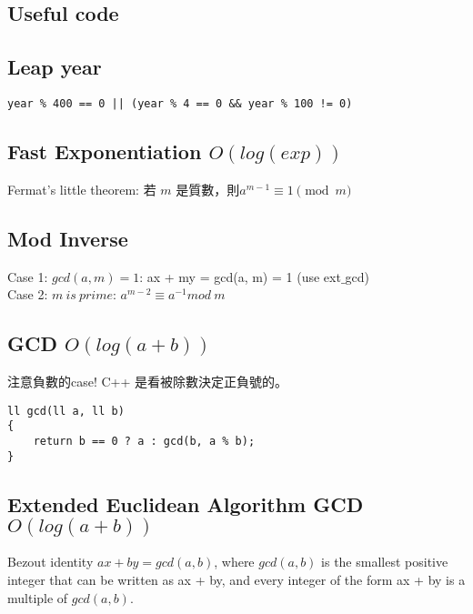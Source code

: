 \documentclass[10pt,oneside]{article}
\begin{document}
\begin{landscape}
\begin{multicols}{2}

\section{Useful code}

\subsection{Leap year}

\begin{lstlisting}
year % 400 == 0 || (year % 4 == 0 && year % 100 != 0)
\end{lstlisting}

\subsection{Fast Exponentiation $O(log(exp))$}

Fermat's little theorem: 若 $m$ 是質數，則$a^{m-1} \equiv 1 \pmod m$



\subsection{Mod Inverse}

Case 1: $gcd(a, m) = 1$:  ax + my = gcd(a, m) = 1 (use ext$\_$gcd) \\

\noindent Case 2: $m\ is\ prime$: $a^{m - 2} \equiv a^{-1} mod\ m$ 

\subsection{GCD $O(log(a + b))$}

注意負數的case! C++ 是看被除數決定正負號的。

\begin{lstlisting}
ll gcd(ll a, ll b)
{
    return b == 0 ? a : gcd(b, a % b);
}
\end{lstlisting}

\subsection{Extended Euclidean Algorithm GCD $O(log(a + b))$}

Bezout identity $ax + by = gcd(a, b)$, where $gcd(a, b)$ is the smallest positive integer that can be written as ax + by, and every integer of the form ax + by is a multiple of $gcd(a, b)$.


\end{multicols}
\end{landscape}
\end{document}
